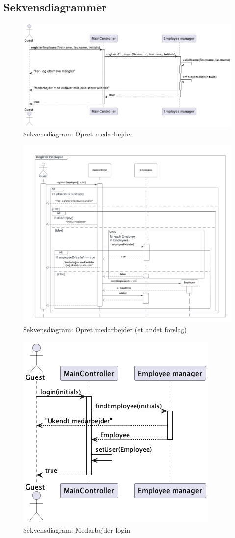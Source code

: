 \subsection{Sekvensdiagrammer}\label{sec:sequence}
\begin{figure}[H]
    \centering
    \caption{Sekvensdiagram: Opret medarbejder}\label{fig:sequence_register_employee1}
    \includegraphics[width = .75\textwidth]{Diagrams/seq_register_employee.png}
\end{figure}
\begin{figure}[H]
    \centering
    \caption{Sekvensdiagram: Opret medarbejder (et andet forslag)}\label{fig:sequence_register_employee2}
    \includegraphics[width = 1\textwidth]{Diagrams/Register Employee.png}
\end{figure}
\begin{figure}[H]
    \centering
    \caption{Sekvensdiagram: Medarbejder login}\label{fig:sequence_login}
    \includegraphics[width = .45\textwidth]{Diagrams/seq_login.png}
\end{figure}
